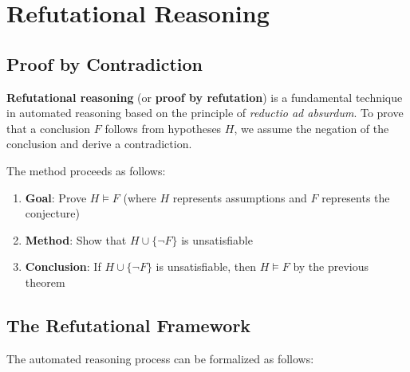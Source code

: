 \documentclass[11pt,a4paper]{article}
\theoremstyle{definition}
\theoremstyle{plain}
\theoremstyle{remark}
\begin{document}
\section{Refutational Reasoning}

\subsection{Proof by Contradiction}

\begin{tcolorbox}[colback=orange!10!white,colframe=orange!75!black,title=\textbf{Refutational Reasoning (Proof by Contradiction)}]
\textbf{Refutational reasoning} (or \textbf{proof by refutation}) is a fundamental technique in automated reasoning based on the principle of \textit{reductio ad absurdum}. To prove that a conclusion $F$ follows from hypotheses $H$, we assume the negation of the conclusion and derive a contradiction.

The method proceeds as follows:
\begin{enumerate}
    \item \textbf{Goal}: Prove $H \models F$ (where $H$ represents assumptions and $F$ represents the conjecture)
    \item \textbf{Method}: Show that $H \cup \{\neg F\}$ is unsatisfiable
    \item \textbf{Conclusion}: If $H \cup \{\neg F\}$ is unsatisfiable, then $H \models F$ by the previous theorem
\end{enumerate}
\end{tcolorbox}

\subsection{The Refutational Framework}

The automated reasoning process can be formalized as follows:

\begin{center}
\end{center}
\end{document}
